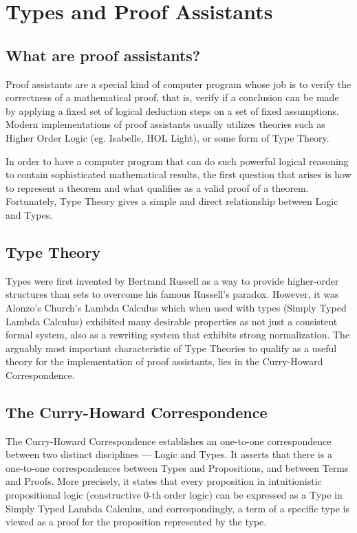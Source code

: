 \chapter{Types and Proof Assistants}

\section{What are proof assistants?}
Proof assistants are a special kind of computer program whose job
is to verify the correctness of a mathematical proof, that is,
verify if a conclusion can be made by applying a fixed set
of logical deduction steps on a set of fixed assumptions. Modern 
implementations of proof assistants usually utilizes theories such as 
Higher Order Logic (eg. Isabelle, HOL Light), or some form of Type Theory.

In order to have a computer program that can do such powerful logical
reasoning to contain sophisticated mathematical results, the first 
question that arises is how to represent a theorem and what qualifies
as a valid proof of a theorem. Fortunately, Type Theory gives a simple
and direct relationship between Logic and Types.

\section{Type Theory}

Types were first invented by Bertrand Russell as a way to provide higher-order
structures than sets to overcome his famous Russell's paradox. However, it was
Alonzo's Church's Lambda Calculus which when used with types (Simply Typed
Lambda Calculus) exhibited many desirable properties as not just a consistent
formal system, also as a rewriting system that exhibits strong normalization.
The arguably most important characteristic of Type Theories to qualify as a 
useful theory for the implementation of proof assistants, lies in the
Curry-Howard Correspondence.

\section{The Curry-Howard Correspondence}

The Curry-Howard Correspondence establishes an one-to-one correspondence between
two distinct disciplines --- Logic and Types. It asserts that there is a
one-to-one correspondences between Types and Propositions, and between Terms and
Proofs. More precisely, it states that every proposition in intuitionistic
propositional logic (constructive 0-th order logic) can be expressed as a Type
in Simply Typed Lambda Calculus, and correspondingly, a term of a specific type
is viewed as a proof for the proposition represented by the type.

